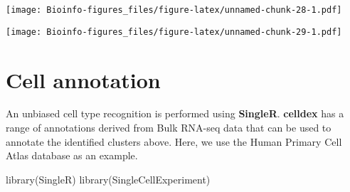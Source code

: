 \documentclass[
  openany]{book}
\newenvironment{Shaded}{\begin{snugshade}}{\end{snugshade}}
\newcommand{\AttributeTok}[1]{\textcolor[rgb]{0.77,0.63,0.00}{#1}}
\newcommand{\ControlFlowTok}[1]{\textcolor[rgb]{0.13,0.29,0.53}{\textbf{#1}}}
\newcommand{\DecValTok}[1]{\textcolor[rgb]{0.00,0.00,0.81}{#1}}
\newcommand{\FunctionTok}[1]{\textcolor[rgb]{0.00,0.00,0.00}{#1}}
\newcommand{\NormalTok}[1]{#1}
\newcommand{\OtherTok}[1]{\textcolor[rgb]{0.56,0.35,0.01}{#1}}
\newcommand{\SpecialCharTok}[1]{\textcolor[rgb]{0.00,0.00,0.00}{#1}}
\newcommand{\StringTok}[1]{\textcolor[rgb]{0.31,0.60,0.02}{#1}}
\begin{document}
\texttt{[image: Bioinfo-figures\_files/figure-latex/unnamed-chunk-28-1.pdf]}

\begin{Shaded}
\end{Shaded}

\texttt{[image: Bioinfo-figures\_files/figure-latex/unnamed-chunk-29-1.pdf]}

\clearpage

\hypertarget{cell-annotation}{%
\section{Cell annotation}\label{cell-annotation}}

An unbiased cell type recognition is performed using \textbf{SingleR}. \textbf{celldex} has a range of annotations derived from Bulk RNA-seq data that can be used to annotate the identified clusters above. Here, we use the Human Primary Cell Atlas database as an example.

\begin{Shaded}
\begin{Highlighting}[]
\FunctionTok{library}\NormalTok{(SingleR)}
\FunctionTok{library}\NormalTok{(SingleCellExperiment)}
\end{Highlighting}
\end{Shaded}
\end{document}
